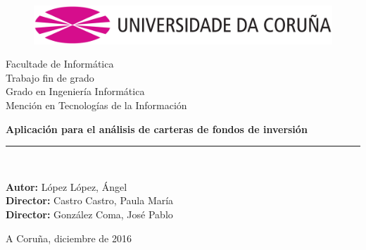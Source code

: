 \documentclass[12pt, a4paper]{article}
\newcommand*\parttitle{}
\let\origpart\part
\renewcommand*{\part}[2][]{%
	\ifx\\#1\\%
	\origpart{#2}%
	\renewcommand*\parttitle{#2}%
	\else
	\origpart[#1]{#2}%
	\renewcommand*\parttitle{#1}%
	\fi
}
\begin{document}
\renewcommand{\partname}{Capítulo}
\renewcommand{\tablename}{Tabla}
\renewcommand{\acronymname }{Acrónimos}
\let\Oldpart\part



\begin{titlepage}

\begin{center}
\vspace*{-0.2in}
\begin{figure}[htb]
\begin{center}
\includegraphics[width=12cm]{figuras/logo.png}
\end{center}
\end{figure}
\vspace*{0.6in}
{\Large Facultade de Informática}\\[1.25cm]
\vspace*{0.15in}
{\LARGE Trabajo fin de grado}\\[0.75cm]
{\LARGE  Grado en Ingeniería Informática}\\[0.5cm]
{Mención en Tecnologías de la Información }\\[1.25cm]
\vspace*{0.6in}
\vspace*{0.2in}
\begin{Large}
\textbf{Aplicación para el análisis de carteras de fondos de inversión} \\
\end{Large}
\vspace*{2in}
\vspace*{0.3in}
\rule{80mm}{0.1mm}\\
\vspace*{0.1in}
\begin{large}
\textbf{Autor:} López López, Ángel\\
\textbf{Director:} Castro Castro, Paula María\\
\textbf{Director:} González Coma, José Pablo \\
\end{large}
\vspace*{0.3in}
A Coruña, diciembre de 2016
\end{center}

\end{titlepage}
\end{document}
